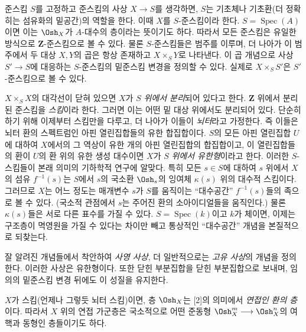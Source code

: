 준스킴 $S$를 고정하고 준스킴의 사상 $X\longrightarrow S$를 생각하면,
$S$는 기초체나 기초환(더 정확히는 섬유화의 밑공간)의 역할을 한다. 이때
$X$를 $S$-준스킴이라 한다. $S=\operatorname{Spec}(A)$이면 이는
$\Osh_X$가 $A$-대수의 층이라는 뜻이기도 하다. 따라서 모든 준스킴은
유일한 방식으로 $\mathbf Z$-준스킴으로 볼 수 있다. 물론 $S$-준스킴들은
범주를 이루며, 더 나아가 이 범주에서 두 대상 $X,Y$의 곱은 항상 존재하고
$X\times_S Y$로 나타낸다. 이 곱 개념으로 사상
$S'\longrightarrow S$에 대응하는 $S$-준스킴의 밑준스킴 변경을 정의할
수 있다. 실제로 $X\times_S S'$은 $S'$-준스킴으로 볼 수 있다.

$X\times_S X$의 대각선이 닫혀 있으면 $X$가 $S$ \emph{위에서 분리}되어
있다고 한다. $\mathbf Z$ 위에서 분리된 준스킴을 \emph{스킴}이라 한다.
그러면 이는 어떤 밑 대상 위에서도 분리되어 있다. 단순히 하기 위해 이제부터
스킴만을 다루고, 더 나아가 이들이 \emph{뇌터}라고 가정한다. 즉 이들은
뇌터 환의 스펙트럼인 아핀 열린집합들의 유한 합집합이다. $S$의 모든 아핀
열린집합 $U$에 대하여 $X$에서의 그 역상이 유한 개의 아핀 열린집합의
합집합이고, 이 열린집합들의 환이 $U$의 환 위의 유한 생성 대수이면 $X$가
$S$ \emph{위에서 유한형}이라고 한다. 이러한 $S$-스킴들이 본래 의미의
기하학적 연구에 알맞다. 특히 모든 $s\in S$에 대하여 $s$ 위에서 $X$의
섬유 $f^{-1}(s)$는 $S$에서 $s$의 국소환 $\Osh_s$의 잉여체
$\kappa(s)$ 위의 대수적 스킴이다. 그러므로 $X$는 어느 정도는 매개변수
$s$가 $S$를 움직이는 ``대수공간'' $f^{-1}(s)$들의 족으로 볼 수 있다.
(국소적 관점에서 $s$는 주어진 환의 소아이디얼들을 움직인다.) 물론
$\kappa(s)$들은 서로 다른 표수를 가질 수 있다. $S=\operatorname{Spec}(k)$이고
$k$가 체이면, 이제는 구조층이 멱영원을 가질 수 있다는 차이만 빼고 통상적인
``대수공간'' 개념을 본질적으로 되찾는다.

잘 알려진 개념들에서 착안하여 \emph{사영 사상}, 더 일반적으로는
\emph{고유 사상}의 개념을 정의한다. 이러한 사상은 유한형이다. 또한 닫힌
부분집합을 닫힌 부분집합으로 보내며, 임의의 밑준스킴 변경 뒤에도 이 성질을
유지한다.

$X$가 스킴(언제나 그렇듯 뇌터 스킴)이면, 층 $\Osh_X$는 [2]의 의미에서
\emph{연접인 환의 층}이다. 따라서 $X$ 위의 연접 가군층은 국소적으로 어떤
준동형 $\Osh_X^{m}\longrightarrow\Osh_X^{n}$의 여핵과 동형인 층들이기도
하다.


